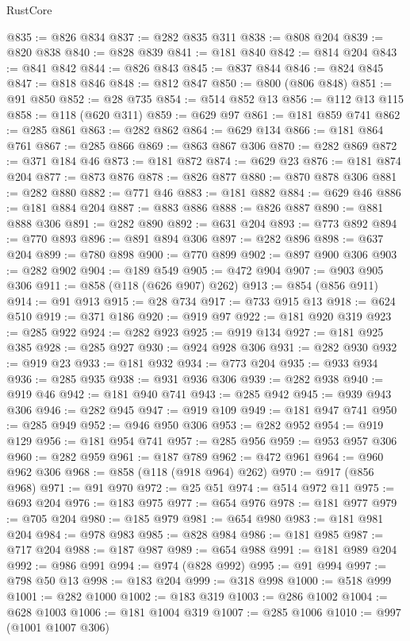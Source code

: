 \begin{lexlean}{RustCore}
\begin{coremodule}
@835 := @826 @834
@837 := @282 @835 @311
@838 := @808 @204
@839 := @820 @838
@840 := @828 @839
@841 := @181 @840
@842 := @814 @204
@843 := @841 @842
@844 := @826 @843
@845 := @837 @844
@846 := @824 @845
@847 := @818 @846
@848 := @812 @847
@850 := @800 (@806 @848)
@851 := @91 @850
@852 := @28 @735
@854 := @514 @852 @13
@856 := @112 @13 @115
@858 := @118 (@620 @311)
@859 := @629 @97
@861 := @181 @859 @741
@862 := @285 @861
@863 := @282 @862
@864 := @629 @134
@866 := @181 @864 @761
@867 := @285 @866
@869 := @863 @867 @306
@870 := @282 @869
@872 := @371 @184 @46
@873 := @181 @872
@874 := @629 @23
@876 := @181 @874 @204
@877 := @873 @876
@878 := @826 @877
@880 := @870 @878 @306
@881 := @282 @880
@882 := @771 @46
@883 := @181 @882
@884 := @629 @46
@886 := @181 @884 @204
@887 := @883 @886
@888 := @826 @887
@890 := @881 @888 @306
@891 := @282 @890
@892 := @631 @204
@893 := @773 @892
@894 := @770 @893
@896 := @891 @894 @306
@897 := @282 @896
@898 := @637 @204
@899 := @780 @898
@900 := @770 @899
@902 := @897 @900 @306
@903 := @282 @902
@904 := @189 @549
@905 := @472 @904
@907 := @903 @905 @306
@911 := @858 (@118 (@626 @907) @262)
@913 := @854 (@856 @911)
@914 := @91 @913
@915 := @28 @734
@917 := @733 @915 @13
@918 := @624 @510
@919 := @371 @186
@920 := @919 @97
@922 := @181 @920 @319
@923 := @285 @922
@924 := @282 @923
@925 := @919 @134
@927 := @181 @925 @385
@928 := @285 @927
@930 := @924 @928 @306
@931 := @282 @930
@932 := @919 @23
@933 := @181 @932
@934 := @773 @204
@935 := @933 @934
@936 := @285 @935
@938 := @931 @936 @306
@939 := @282 @938
@940 := @919 @46
@942 := @181 @940 @741
@943 := @285 @942
@945 := @939 @943 @306
@946 := @282 @945
@947 := @919 @109
@949 := @181 @947 @741
@950 := @285 @949
@952 := @946 @950 @306
@953 := @282 @952
@954 := @919 @129
@956 := @181 @954 @741
@957 := @285 @956
@959 := @953 @957 @306
@960 := @282 @959
@961 := @187 @789
@962 := @472 @961
@964 := @960 @962 @306
@968 := @858 (@118 (@918 @964) @262)
@970 := @917 (@856 @968)
@971 := @91 @970
@972 := @25 @51
@974 := @514 @972 @11
@975 := @693 @204
@976 := @183 @975
@977 := @654 @976
@978 := @181 @977
@979 := @705 @204
@980 := @185 @979
@981 := @654 @980
@983 := @181 @981 @204
@984 := @978 @983
@985 := @828 @984
@986 := @181 @985
@987 := @717 @204
@988 := @187 @987
@989 := @654 @988
@991 := @181 @989 @204
@992 := @986 @991
@994 := @974 (@828 @992)
@995 := @91 @994
@997 := @798 @50 @13
@998 := @183 @204
@999 := @318 @998
@1000 := @518 @999
@1001 := @282 @1000
@1002 := @183 @319
@1003 := @286 @1002
@1004 := @628 @1003
@1006 := @181 @1004 @319
@1007 := @285 @1006
@1010 := @997 (@1001 @1007 @306)

\end{coremodule}
\end{lexlean}
